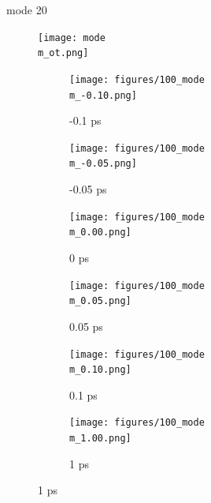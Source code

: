 \documentclass{beamer}
\newcommand\w{0.32}
\begin{document}
\renewcommand\m{20}
\begin{frame}{mode \m}
					\vspace{\vh mm}
	\begin{figure}
		\centering
		\texttt{[image: mode\\m\_ot.png]}
	\end{figure}
	\begin{figure}
		\centering
		\begin{subfigure}[b]{\w\textwidth}
			\centering
			\texttt{[image: figures/100\_mode\\m\_-0.10.png]}
			\caption{-0.1 ps}
		\end{subfigure}
		\begin{subfigure}[b]{\w\textwidth}
			\centering
			\texttt{[image: figures/100\_mode\\m\_-0.05.png]}
			\caption{-0.05 ps}
		\end{subfigure}
		\begin{subfigure}[b]{\w\textwidth}
			\centering
			\texttt{[image: figures/100\_mode\\m\_0.00.png]}
			\caption{0 ps}
		\end{subfigure}
		\begin{subfigure}[b]{\w\textwidth}
			\centering
			\texttt{[image: figures/100\_mode\\m\_0.05.png]}
			\caption{0.05 ps}
		\end{subfigure}
		\begin{subfigure}[b]{\w\textwidth}
			\centering
			\texttt{[image: figures/100\_mode\\m\_0.10.png]}
			\caption{0.1 ps}
		\end{subfigure}
		\begin{subfigure}[b]{\w\textwidth}
			\centering
			\texttt{[image: figures/100\_mode\\m\_1.00.png]}
			\caption{1 ps}
		\end{subfigure}
	\end{figure}
\end{frame}
\end{document}
